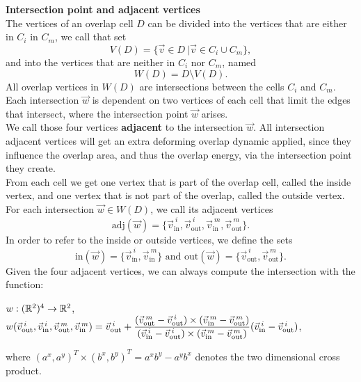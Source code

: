 \begin{definition} \textbf{Intersection point and adjacent vertices} \\
	The vertices of an overlap cell $D$ can be divided into the vertices that are either in $C_i$ in $C_m$, we call that set 
	\[V(D) = \{\vec{v} \in D \:| \vec{v} \in C_i \cup C_m \}, \] 
	and into the vertices that are neither in $C_i$ nor $C_m$, named 
	\[W(D) = D \setminus V(D).\]
	All overlap vertices in $W(D)$ are intersections between the cells $C_i$ and $C_m$. \\
	Each intersection $\vec{w}$ is dependent on two vertices of each cell that limit the edges that intersect, where the intersection point $\vec{w}$ arises. \\
	We call those four vertices \textbf{adjacent} to the intersection $\vec{w}$. 
	All intersection adjacent vertices will get an extra deforming overlap dynamic applied, since they influence the overlap area, and thus the overlap energy, via the intersection point they create. \\
	From each cell we get one vertex that is part of the overlap cell, called the inside vertex, and one vertex that is not part of the overlap, called the outside vertex. 
	For each intersection $\vec{w} \in W(D)$, we call its adjacent vertices 
	\[\text{adj}(\vec{w}) = \{\vec{v}_{\text{in}}^{\: i}, \vec{v}_{\text{out}}^{\: i}, \vec{v}_{\text{in}}^{\: m}, \vec{v}_{\text{out}}^{\: m} \}. \]
	In order to refer to the inside or outside vertices, we define the sets 
	\[ \text{in}(\vec{w}) = \{\vec{v}_{\text{in}}^{\: i}, \vec{v}_{\text{in}}^{\: m} \} \text{ and } \text{out}(\vec{w}) = \{\vec{v}_{\text{out}}^{\: i}, \vec{v}_{\text{out}}^{\: m} \}.\]
	Given the four adjacent vertices, we can always compute the intersection with the function:
	\begin{center}
		$w: (\mathbb{R}^2)^4 \rightarrow \mathbb{R}^2$, \\[0.5em]
		$w(\vec{v}_{\text{out}}^{\: i}, \vec{v}_{\text{in}}^{\: i}, \vec{v}_{\text{out}}^{\: m}, \vec{v}_{\text{in}}^{\: m}) = \vec{v}_{\text{out}}^{\: i} + \dfrac{(\vec{v}_{\text{out}}^{\: m} - \vec{v}_{\text{out}}^{\: i}) \times (\vec{v}_{\text{in}}^{\: m} - \vec{v}_{\text{out}}^{\: m})}{(\vec{v}_{\text{in}}^{\: i} - \vec{v}_{\text{out}}^{\: i}) \times (\vec{v}_{\text{in}}^{\: m} - \vec{v}_{\text{out}}^{\: m})} (\vec{v}_{\text{in}}^{\: i} - \vec{v}_{\text{out}}^{\: i})$,
	\end{center}
	where $(a^x, a^y)^T \times (b^x, b^y)^T = a^x b^y - a^y b^x$ denotes the two dimensional cross product. \\
\end{definition}

